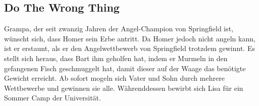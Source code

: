 \subsection{Do The Wrong Thing}
Grampa, der seit zwanzig Jahren der Angel-Champion von Springfield ist, wünscht sich, dass Homer sein Erbe antritt. Da Homer jedoch nicht angeln kann, ist er erstaunt, als er den Angelwettbewerb von Springfield trotzdem gewinnt. Es stellt sich heraus, dass Bart ihm geholfen hat, indem er Murmeln in den gefangenen Fisch geschmuggelt hat, damit dieser auf der Waage das benötigte Gewicht erreicht. Ab sofort mogeln sich Vater und Sohn durch mehrere Wettbewerbe und gewinnen sie alle. Währenddessen bewirbt sich Lisa für ein Sommer Camp der Universität.